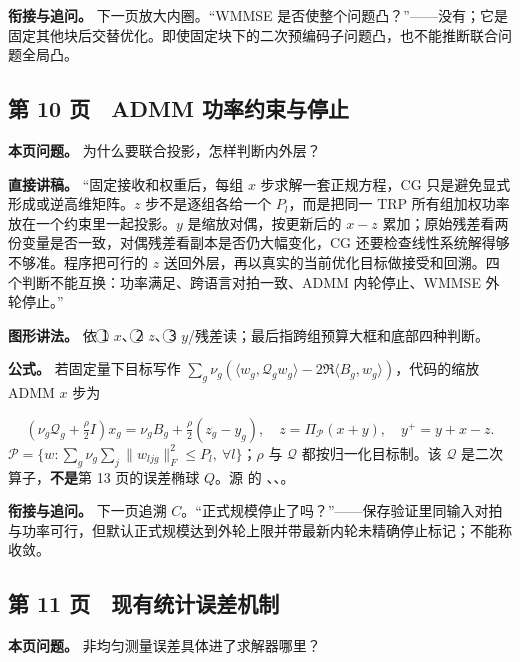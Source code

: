 \documentclass[11pt,a4paper]{ctexart}
\begin{document}
\textbf{衔接与追问。} 下一页放大内圈。“WMMSE 是否使整个问题凸？”——没有；它是固定其他块后交替优化。即使固定块下的二次预编码子问题凸，也不能推断联合问题全局凸。\par

\subsection*{第 10 页　ADMM 功率约束与停止}

\textbf{本页问题。} 为什么要联合投影，怎样判断内外层？\par

\textbf{直接讲稿。} “固定接收和权重后，每组 $x$ 步求解一套正规方程，CG 只是避免显式形成或逆高维矩阵。$z$ 步不是逐组各给一个 $P_l$，而是把同一 TRP 所有组加权功率放在一个约束里一起投影。$y$ 是缩放对偶，按更新后的 $x-z$ 累加；原始残差看两份变量是否一致，对偶残差看副本是否仍大幅变化，CG 还要检查线性系统解得够不够准。程序把可行的 $z$ 送回外层，再以真实的当前优化目标做接受和回溯。四个判断不能互换：功率满足、跨语言对拍一致、ADMM 内轮停止、WMMSE 外轮停止。”\par

\textbf{图形讲法。} 依 \textcircled{1} $x$、\textcircled{2} $z$、\textcircled{3} $y$/残差读；最后指跨组预算大框和底部四种判断。\par

\textbf{公式。} 若固定量下目标写作 $\sum_g\nu_g(\langle w_g,\mathcal Q_gw_g\rangle-2\Re\langle B_g,w_g\rangle)$，代码的缩放 ADMM $x$ 步为\par
\[
(\nu_g\mathcal Q_g+\tfrac\rho2 I)x_g
=\nu_g B_g+\tfrac\rho2(z_g-y_g),\quad
z=\Pi_{\mathcal P}(x+y),\quad y^+=y+x-z.
\]
$\mathcal P=\{w: \sum_g\nu_g\sum_j\|w_{ljg}\|_F^2\le P_l,\ \forall l\}$；$\rho$ 与 $\mathcal Q$ 都按归一化目标制。该 $\mathcal Q$ 是二次算子，\textbf{不是}第 13 页的误差椭球 $Q$。源  的 、、。\par

\textbf{衔接与追问。} 下一页追溯 $C$。“正式规模停止了吗？”——保存验证里同输入对拍与功率可行，但默认正式规模达到外轮上限并带最新内轮未精确停止标记；不能称收敛。\par

\subsection*{第 11 页　现有统计误差机制}

\textbf{本页问题。} 非均匀测量误差具体进了求解器哪里？\par
\end{document}
